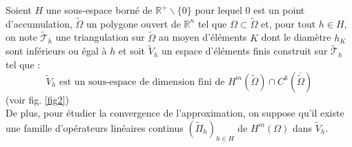 \documentclass{article}
\begin{document}
Soient $H$ une sous-espace borné de $\mathbb{R}^+\backslash\{0\}$ pour lequel $0$ est un point d'accumulation, $\tilde{\Omega}$ un polygone ouvert de $\mathbb{R}^n$ tel que $\Omega\subset\tilde{\Omega}$ et, pour tout $h\in H$, on note $\tilde{\mathscr{T}}_h$ une triangulation sur $\tilde{\Omega}$ au moyen d'éléments $K$ dont le diamètre $h_K$ sont inférieurs ou égal à $h$ et soit $\tilde{V}_h$ un espace d'éléments finis construit sur $\tilde{\mathscr{T}}_h$ tel que :
\begin{equation} \label{eq5} \tilde{V}_h \text{ est un sous-espace de dimension fini de } H^m\left(\tilde{\Omega}\right)\cap C^k\left(\overline{\tilde{\Omega}}\right) \end{equation}
(voir fig. \ref{fig2})
\\
De plus, pour étudier la convergence de l'approximation, on suppose qu'il existe une famille d'opérateurs linéaires continus $(\tilde{\Pi}_h)_{h\in H}$ de $H^m(\Omega)$ dans $\tilde{V}_h$.
\end{document}
